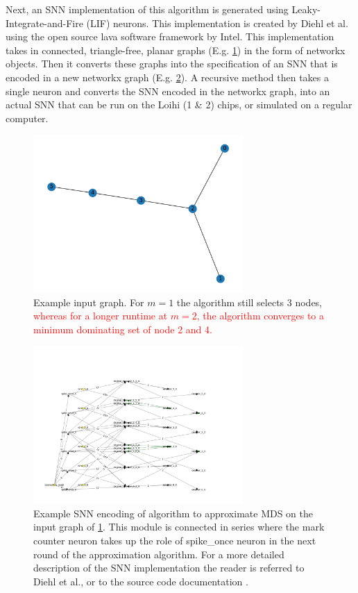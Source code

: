 Next, an SNN implementation of this algorithm is generated using Leaky-Integrate-and-Fire (LIF) neurons. This implementation is created by Diehl et al. \cite{diehl} using the open source lava software framework by Intel. This implementation takes in connected, triangle-free, planar graphs (E.g. \cref{fig:input_graph}) in the form of networkx objects. Then it converts these graphs into the specification of an SNN that is encoded in a new networkx graph (E.g. \cref{fig:encoded_snn}). A recursive method then takes a single neuron and converts the SNN encoded in the networkx graph, into an actual SNN that can be run on the Loihi (1 \& 2) chips, or simulated on a regular computer.
\begin{figure}[H]
    \centering
    \includegraphics[width=8cm]{latex/Images/input_graph_G_6_0.png}
    \caption{Example input graph. For $m=1$ the algorithm still selects 3 nodes, \textcolor{red}{whereas for a longer runtime at $m=2$, the algorithm converges to a minimum dominating set of node 2 and 4.}}
    \label{fig:input_graph}
\end{figure}

\begin{figure}[H]
    \centering
    \includegraphics[width=8cm]{latex/Images/structured_graph_snn_m0_n6_iter0_t77.png}
    \caption{Example SNN encoding of algorithm to approximate MDS on the input graph of \cref{fig:input_graph}. This module is connected in series where the mark counter neuron takes up the role of spike\_once neuron in the next round of the approximation algorithm. For a more detailed description of the SNN implementation the reader is referred to Diehl et al., or to the source code documentation \cite{}. %
    }
    \label{fig:encoded_snn}
\end{figure}

